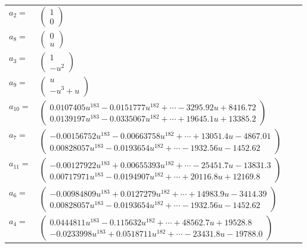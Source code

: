 \documentclass[1p]{elsarticle_modified}
\theoremstyle{definition}
\begin{document}
\begin{tabular}{m{7pt} m{180pt} m{7pt} m{180pt} }
\flushright $a_{2}=$&$\begin{pmatrix}1\\0\end{pmatrix}$ \\
\flushright $a_{8}=$&$\begin{pmatrix}0\\u\end{pmatrix}$ \\
\flushright $a_{3}=$&$\begin{pmatrix}1\\- u^2\end{pmatrix}$ \\
\flushright $a_{9}=$&$\begin{pmatrix}u\\- u^3+u\end{pmatrix}$ \\
\flushright $a_{10}=$&$\begin{pmatrix}0.0107405 u^{183}-0.0151777 u^{182}+\cdots-3295.92 u+8416.72\\0.0139197 u^{183}-0.0335067 u^{182}+\cdots+19645.1 u+13385.2\end{pmatrix}$ \\
\flushright $a_{7}=$&$\begin{pmatrix}-0.00156752 u^{183}-0.00663758 u^{182}+\cdots+13051.4 u-4867.01\\0.00828057 u^{183}-0.0193654 u^{182}+\cdots-1932.56 u-1452.62\end{pmatrix}$ \\
\flushright $a_{11}=$&$\begin{pmatrix}-0.00127922 u^{183}+0.00655393 u^{182}+\cdots-25451.7 u-13831.3\\0.00717971 u^{183}-0.0194907 u^{182}+\cdots+20116.8 u+12169.8\end{pmatrix}$ \\
\flushright $a_{6}=$&$\begin{pmatrix}-0.00984809 u^{183}+0.0127279 u^{182}+\cdots+14983.9 u-3414.39\\0.00828057 u^{183}-0.0193654 u^{182}+\cdots-1932.56 u-1452.62\end{pmatrix}$ \\
\flushright $a_{4}=$&$\begin{pmatrix}0.0444811 u^{183}-0.115632 u^{182}+\cdots+48562.7 u+19528.8\\-0.0233998 u^{183}+0.0518711 u^{182}+\cdots-23431.8 u-19788.0\end{pmatrix}$ \\

\end{tabular}
\end{document}

